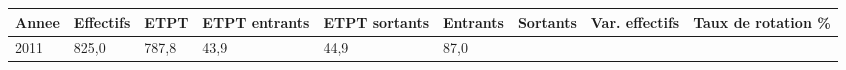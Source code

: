 \begin{longtable}[]{@{}lllllllll@{}}
\toprule
\begin{minipage}[b]{0.05\columnwidth}\raggedright
Annee\strut
\end{minipage} & \begin{minipage}[b]{0.08\columnwidth}\raggedright
Effectifs\strut
\end{minipage} & \begin{minipage}[b]{0.05\columnwidth}\raggedright
ETPT\strut
\end{minipage} & \begin{minipage}[b]{0.10\columnwidth}\raggedright
ETPT entrants\strut
\end{minipage} & \begin{minipage}[b]{0.10\columnwidth}\raggedright
ETPT sortants\strut
\end{minipage} & \begin{minipage}[b]{0.07\columnwidth}\raggedright
Entrants\strut
\end{minipage} & \begin{minipage}[b]{0.07\columnwidth}\raggedright
Sortants\strut
\end{minipage} & \begin{minipage}[b]{0.11\columnwidth}\raggedright
Var. effectifs\strut
\end{minipage} & \begin{minipage}[b]{0.14\columnwidth}\raggedright
Taux de rotation \%\strut
\end{minipage}\tabularnewline
\midrule
\endhead
\begin{minipage}[t]{0.05\columnwidth}\raggedright
2011\strut
\end{minipage} & \begin{minipage}[t]{0.08\columnwidth}\raggedright
825,0\strut
\end{minipage} & \begin{minipage}[t]{0.05\columnwidth}\raggedright
787,8\strut
\end{minipage} & \begin{minipage}[t]{0.10\columnwidth}\raggedright
43,9\strut
\end{minipage} & \begin{minipage}[t]{0.10\columnwidth}\raggedright
44,9\strut
\end{minipage} & \begin{minipage}[t]{0.07\columnwidth}\raggedright
87,0\strut
\end{minipage} & \begin{minipage}[t]{0.07\columnwidth}\raggedright

\end{minipage}
\end{longtable}
